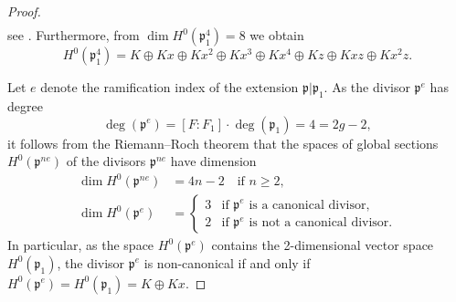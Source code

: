 \documentclass[12pt,reqno]{amsart}
\newcommand{\toda}[2][]{\todo[color=blue!30, #1]{#2}} %
\theoremstyle{definition}
\newcommand{\pp}{\mathfrak{p}}
\begin{document}
\begin{proof}
\begin{align*}
\end{align*}
see \cite[Remark 2.3]{HiSt23}. Furthermore, from $\dim H^0(\pp_1^4)=8$ we obtain
\begin{equation}\label{2023_12_10_18:45}
H^0(\pp_1^4) = K \oplus Kx \oplus Kx^2 \oplus Kx^3 \oplus Kx^4 \oplus Kz \oplus Kxz \oplus Kx^2 z. 
\end{equation}

Let 
$e$ denote the ramification index of the extension $\pp|\pp_1$.
As
the divisor $\pp^e$ has degree 
\[ \deg(\pp^e) = [F:F_1] \cdot \deg(\pp_1) = 4 = 2g-2,  \] 
it follows from the Riemann--Roch theorem that the spaces of global sections $H^0(\pp^{ne})$ of the divisors $\pp^{ne}$ have dimension
\begin{align*}
    \dim H^0(\pp^{ne}) &= 4n-2 \quad \text{if $n \geq 2$},\\
    \dim H^0(\pp^e) &= 
    \begin{cases} 3 & \text{if $\pp^e$ is a canonical divisor},\\
    2 & \text{if $\pp^e$ is not a canonical divisor}. \end{cases}
\end{align*}
In particular, as the space $H^0(\pp^e)$ contains the 2-dimensional vector space $H^0(\pp_1)$, the divisor $\pp^e$ is non-canonical if and only if $H^0(\pp^e)=H^0(\pp_1)= K \oplus Kx$.


\end{proof}
\end{document}

